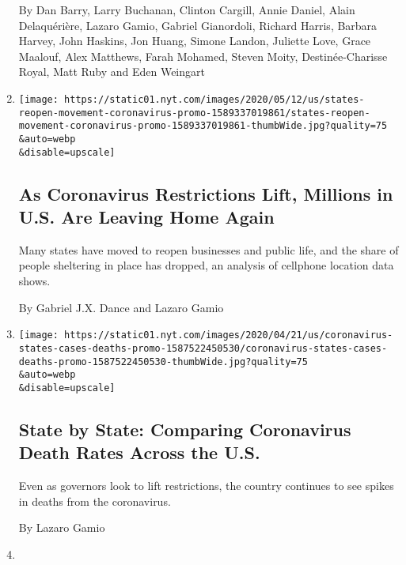 \begin{enumerate}
  By Dan Barry, Larry Buchanan, Clinton Cargill, Annie Daniel, Alain
  Delaquérière, Lazaro Gamio, Gabriel Gianordoli, Richard Harris,
  Barbara Harvey, John Haskins, Jon Huang, Simone Landon, Juliette Love,
  Grace Maalouf, Alex Matthews, Farah Mohamed, Steven Moity,
  Destinée-Charisse Royal, Matt Ruby and Eden Weingart
\item
  \href{/interactive/2020/05/12/us/coronavirus-reopening-shutdown.html}{}

  \texttt{[image: https://static01.nyt.com/images/2020/05/12/us/states-reopen-movement-coronavirus-promo-1589337019861/states-reopen-movement-coronavirus-promo-1589337019861-thumbWide.jpg?quality=75\\\&auto=webp\\\&disable=upscale]}

  \hypertarget{as-coronavirus-restrictions-lift-millions-in-us-are-leaving-home-again}{%
  \subsection{As Coronavirus Restrictions Lift, Millions in U.S. Are
  Leaving Home
  Again}\label{as-coronavirus-restrictions-lift-millions-in-us-are-leaving-home-again}}

  Many states have moved to reopen businesses and public life, and the
  share of people sheltering in place has dropped, an analysis of
  cellphone location data shows.

  By Gabriel J.X. Dance and Lazaro Gamio
\item
  \href{/interactive/2020/04/22/us/coronavirus-death-rates.html}{}

  \texttt{[image: https://static01.nyt.com/images/2020/04/21/us/coronavirus-states-cases-deaths-promo-1587522450530/coronavirus-states-cases-deaths-promo-1587522450530-thumbWide.jpg?quality=75\\\&auto=webp\\\&disable=upscale]}

  \hypertarget{state-by-state-comparing-coronavirus-death-rates-across-the-us}{%
  \subsection{State by State: Comparing Coronavirus Death Rates Across
  the
  U.S.}\label{state-by-state-comparing-coronavirus-death-rates-across-the-us}}

  Even as governors look to lift restrictions, the country continues to
  see spikes in deaths from the coronavirus.

  By Lazaro Gamio
\item
  \href{/interactive/2020/04/06/us/coronavirus-deaths-united-states.html}{}


\end{enumerate}

